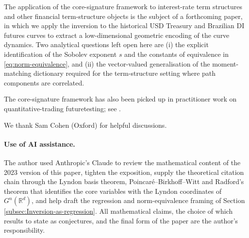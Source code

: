 \documentclass[12pt,english]{article}
\theoremstyle{remark}
\begin{document}
The application of the core-signature framework to interest-rate term
structures and other financial term-structure objects is the subject
of a forthcoming paper, in which we apply the inversion to the historical
USD Treasury and Brazilian DI futures curves to extract a low-dimensional
geometric encoding of the curve dynamics. Two analytical questions
left open here are (i) the explicit identification of the Sobolev
exponent $s$ and the constants of equivalence in \eqref{eq:norm-equivalence},
and (ii) the vector-valued generalisation of the moment-matching dictionary
required for the term-structure setting where path components are
correlated.

The core-signature framework has also been picked up in practitioner
work on quantitative-trading futuretesting; see \cite{bloch_futuretesting}.

We thank Sam Cohen (Oxford) for helpful discussions.

\paragraph{Use of AI assistance.}
The author used Anthropic's Claude to review the mathematical content
of the 2023 version of this paper, tighten the exposition, supply
the theoretical citation chain through the Lyndon basis theorem,
Poincaré--Birkhoff--Witt and Radford's theorem that identifies the
core variables with the Lyndon coordinates of $G^{n}(\mathbb{R}^{d})$,
and help draft the regression and norm-equivalence framing of Section
\ref{subsec:Inversion-as-regression}. All mathematical claims, the
choice of which results to state as conjectures, and the final form
of the paper are the author's responsibility.

\pagebreak{}
\end{document}
